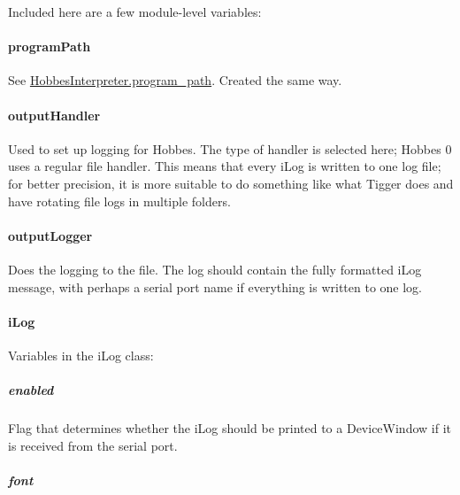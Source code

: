 \documentclass[12pt,letterpaper]{article}
\begin{document}
Included here are a few module-level variables:

\setcounter{paragraph}{-1}



%
%
\paragraph{programPath}
\label{4.6.2.0}

See \hyperref[4.1.2.1]{HobbesInterpreter.program\_path}. Created the same way.



%
%
\paragraph{outputHandler}
\label{4.6.2.1}

Used to set up logging for Hobbes. The type of handler is selected here; Hobbes 0 uses a regular file handler. This means that every iLog is written to one log file; for better precision, it is more suitable to do something like what Tigger does and have rotating file logs in multiple folders.



%
%
\paragraph{outputLogger}
\label{4.6.2.2}

Does the logging to the file. The log should contain the fully formatted iLog message, with perhaps a serial port name if everything is written to one log.



%
%
\paragraph{iLog}
\label{4.6.2.3}

Variables in the iLog class:

\setcounter{subparagraph}{-1}



%
%
\subparagraph{enabled}
\label{4.6.2.3.0}

Flag that determines whether the iLog should be printed to a DeviceWindow if it is received from the serial port.



%
%
\subparagraph{font}
\label{4.6.2.3.1}
\end{document}
